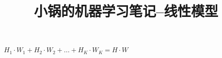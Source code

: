 \documentclass[withoutpreface,bwprint]{cumcmthesis} %
\title{小锅的机器学习笔记--线性模型}
\begin{document}
$H_1\cdot W_1+H_2\cdot W_2+...+H_K\cdot W_K=H\cdot W$
\end{document}

